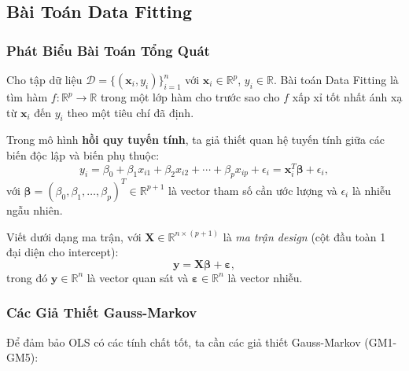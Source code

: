 ﻿\subsection{Bài Toán Data Fitting}


\subsubsection{Phát Biểu Bài Toán Tổng Quát}

\begin{tcolorbox}[mycodebox, colback=blue!3!white, colframe=blue!40!black,
    title={\textbf{Định nghĩa 1.1} - Bài Toán Data Fitting}]
Cho tập dữ liệu $\mathcal{D} = \{(\mathbf{x}_i, y_i)\}_{i=1}^n$ với
$\mathbf{x}_i \in \mathbb{R}^p$, $y_i \in \mathbb{R}$.
Bài toán Data Fitting là tìm hàm $f : \mathbb{R}^p \to \mathbb{R}$ trong một
lớp hàm cho trước sao cho $f$ xấp xỉ tốt nhất ánh xạ từ $\mathbf{x}_i$ đến
$y_i$ theo một tiêu chí đã định.
\end{tcolorbox}

Trong mô hình \textbf{hồi quy tuyến tính}, ta giả thiết quan hệ tuyến tính
giữa các biến độc lập và biến phụ thuộc:
\begin{equation}
    y_i = \beta_0 + \beta_1 x_{i1} + \beta_2 x_{i2} + \cdots + \beta_p x_{ip}
          + \epsilon_i
        = \mathbf{x}_i^T \boldsymbol{\beta} + \epsilon_i,
    \label{eq:linear_model}
\end{equation}
với $\boldsymbol{\beta} = (\beta_0, \beta_1, \ldots, \beta_p)^T \in \mathbb{R}^{p+1}$
là vector tham số cần ước lượng và $\epsilon_i$ là nhiễu ngẫu nhiên.

Viết dưới dạng ma trận, với
$\mathbf{X} \in \mathbb{R}^{n \times (p+1)}$ là \emph{ma trận design} (cột đầu
toàn 1 đại diện cho intercept):
\begin{equation}
    \mathbf{y} = \mathbf{X}\boldsymbol{\beta} + \boldsymbol{\varepsilon},
    \label{eq:matrix_form}
\end{equation}
trong đó $\mathbf{y} \in \mathbb{R}^n$ là vector quan sát và
$\boldsymbol{\varepsilon} \in \mathbb{R}^n$ là vector nhiễu.

\subsubsection{Các Giả Thiết Gauss-Markov}

Để đảm bảo OLS có các tính chất tốt, ta cần các giả thiết Gauss-Markov
(GM1-GM5):

